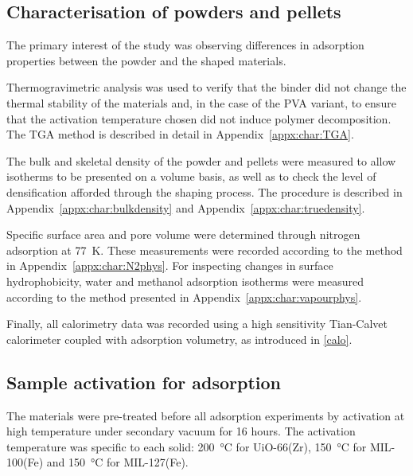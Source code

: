 \subsection{Characterisation of powders and pellets}

The primary interest of the study was observing differences
in adsorption properties between the powder and the shaped materials.

Thermogravimetric analysis was used to verify that the binder
did not change the thermal stability of the materials and, in the
case of the PVA variant, to ensure that the activation temperature
chosen did not induce polymer decomposition. The TGA method is described
in detail in Appendix~\ref{appx:char:TGA}.

The bulk and skeletal density of the powder and pellets were measured
to allow isotherms to be presented on a volume basis, as well as
to check the level of densification afforded through the
shaping process. The procedure is described in Appendix~\ref{appx:char:bulkdensity} and Appendix~\ref{appx:char:truedensity}.

Specific surface area and pore volume were determined through
nitrogen adsorption at \SI{77}{\kelvin}. These measurements were
recorded according to the method in Appendix~\ref{appx:char:N2phys}.
For inspecting changes in surface hydrophobicity, water and
methanol adsorption isotherms were measured according to
the method presented in Appendix~\ref{appx:char:vapourphys}.

Finally, all calorimetry data was recorded using a high sensitivity
Tian-Calvet calorimeter coupled with adsorption volumetry, as
introduced in \autoref{calo}.

\subsection{Sample activation for adsorption}

The materials were pre-treated before all adsorption experiments by
activation at high temperature under secondary vacuum for 16 hours.
The activation temperature was specific
to each solid: \SI{200}{\degreeCelsius} for UiO-66(Zr),
\SI{150}{\degreeCelsius} for MIL-100(Fe) and \SI{150}{\degreeCelsius}
for MIL-127(Fe).
